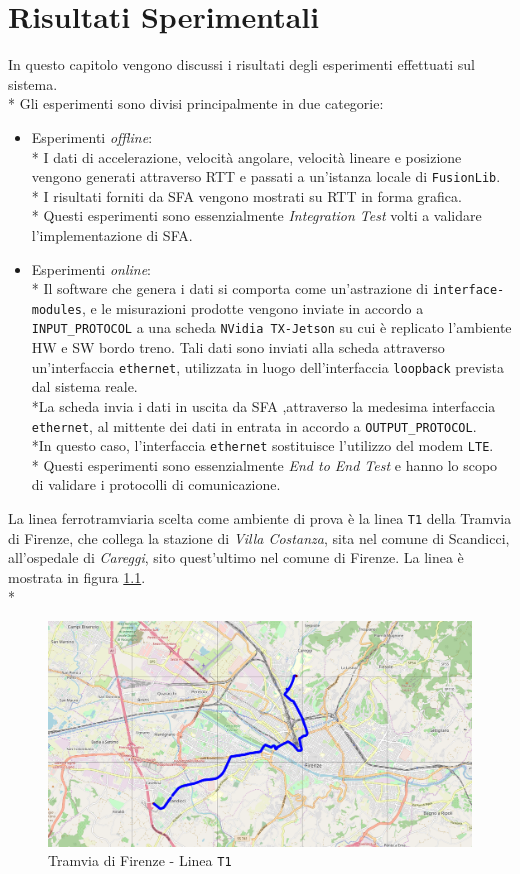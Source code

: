 \chapter{Risultati Sperimentali}
In questo capitolo vengono discussi i risultati degli esperimenti effettuati sul sistema.\\*
Gli esperimenti sono divisi principalmente in due categorie:
\begin{itemize}
	\item Esperimenti \emph{offline}:\\*
	I dati di accelerazione, velocit\`a angolare, velocit\`a lineare e posizione vengono generati attraverso RTT e passati a un'istanza locale di \texttt{FusionLib}.\\*
	I risultati forniti da SFA vengono mostrati su RTT in forma grafica.\\* Questi esperimenti sono essenzialmente \emph{Integration Test} volti a validare l'implementazione di SFA.
	\item Esperimenti \emph{online}:\\*
	Il software che genera i dati si comporta come un'astrazione di \texttt{interface-modules}, e le misurazioni prodotte vengono inviate in accordo a \texttt{INPUT\_PROTOCOL} a una scheda \texttt{NVidia TX-Jetson} su cui \`e replicato l'ambiente HW e SW bordo treno. Tali dati sono inviati alla scheda attraverso un'interfaccia \texttt{ethernet}, utilizzata in luogo dell'interfaccia \texttt{loopback} prevista dal sistema reale.\\*La scheda invia i dati in uscita da SFA ,attraverso la medesima interfaccia \texttt{ethernet}, al mittente dei dati in entrata in accordo a \texttt{OUTPUT\_PROTOCOL}.\\*In questo caso, l'interfaccia \texttt{ethernet} sostituisce l'utilizzo del modem \texttt{LTE}.\\*
	Questi esperimenti sono essenzialmente \emph{End to End Test} e hanno lo scopo di validare i protocolli di comunicazione.
\end{itemize}
La linea ferrotramviaria scelta come ambiente di prova \`e la linea \texttt{T1} della Tramvia di Firenze, che collega la stazione di \emph{Villa Costanza}, sita nel comune di Scandicci, all'ospedale di \emph{Careggi}, sito quest'ultimo nel comune di Firenze. La linea \`e mostrata in figura \ref{fig:t1}.\\*
\begin{figure}[h]
	\centering
	\includegraphics[width=\linewidth]{img/t1}
	\caption{Tramvia di Firenze - Linea \texttt{T1}}
	\label{fig:t1}
\end{figure}
